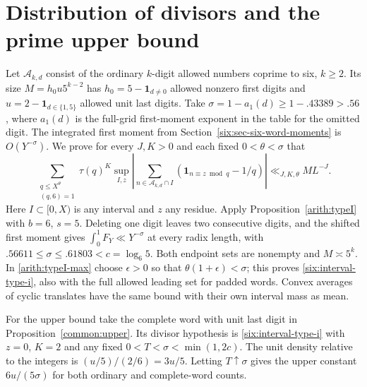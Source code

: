 \documentclass[11pt,a4paper]{article}
\theoremstyle{paperplain}
\numberwithin{equation}{section}
\begin{document}
\section{Distribution of divisors and the prime upper bound}
Let $\mathcal A_{k,d}$ consist of the ordinary $k$-digit allowed numbers
coprime to six, $k\ge2$. Its size $M=h_0 u5^{k-2}$ has
$h_0=5-\mathbf1_{d\ne0}$ allowed nonzero first digits and
$u=2-\mathbf1_{d\in\{1,5\}}$ allowed unit last digits. Take
$\sigma=1-a_1(d)\ge1-.43389>.56$, where $a_1(d)$ is the full-grid
first-moment exponent in the table for the omitted digit. The integrated first moment from
Section~\ref{six:sec-six-word-moments} is $O(Y^{-\sigma})$. We prove
for every $J,K>0$ and each fixed $0<\theta<\sigma$ that
\begin{equation}\label{six:interval-type-i}
 \sum_{\substack{q\le X^\theta\\(q,6)=1}}\tau(q)^K
 \sup_{I,z}\left|\sum_{n\in \mathcal A_{k,d}\cap I}
       (\mathbf1_{n\equiv z\bmod q}-1/q)\right|\ll_{J,K,\theta}M L^{-J}.
\end{equation}
Here $I\subset[0,X)$ is any interval and $z$ any residue. Apply
Proposition~\ref{arith:typeI} with $b=6$, $s=5$. Deleting one digit
leaves two consecutive digits, and the shifted first moment gives
$\int_0^1 F_Y\ll Y^{-\sigma}$ at every radix length, with
$.56611\le\sigma\le.61803<c=\log_6 5$. Both endpoint sets are
nonempty and $M\asymp5^k$. In \eqref{arith:typeI-max} choose
$\epsilon>0$ so that $\theta(1+\epsilon)<\sigma$; this proves
\eqref{six:interval-type-i}, also with the full allowed leading set
for padded words. Convex averages of cyclic translates have the same
bound with their own interval mass as mean.

For the upper bound take the complete word with unit last digit in
Proposition~\ref{common:upper}. Its divisor hypothesis is
\eqref{six:interval-type-i} with $z=0$, $K=2$ and any fixed
$0<T<\sigma<\min(1,2c)$. The unit density relative to the integers
is $(u/5)/(2/6)=3u/5$. Letting $T\uparrow\sigma$ gives the upper
constant $6u/(5\sigma)$ for both ordinary and complete-word counts.
\end{document}
